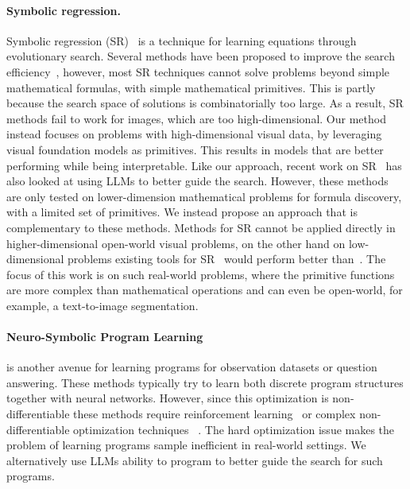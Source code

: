 \paragraph{Symbolic regression.}
Symbolic regression (SR)~\citep{cranmer2023interpretable} is a technique for learning equations through evolutionary search.
Several methods have been proposed to improve the search efficiency~\citep{makke2024interpretable}, however, most SR techniques cannot solve problems beyond simple mathematical formulas, with simple mathematical primitives.
This is partly because the search space of solutions is combinatorially too large. 
As a result, SR methods fail to work for images, which are too high-dimensional.
Our method instead focuses on problems with high-dimensional visual data, by leveraging visual foundation models as primitives.
This results in models that are better performing while being interpretable.
Like our approach, recent work on SR~\citep{grayeli2024symbolic, shojaee2024llm,merler2024context,li2024automated} has also looked at using LLMs to better guide the search.
However, these methods are only tested on lower-dimension mathematical problems for formula discovery, with a limited set of primitives. 
We instead propose an approach that is complementary to these methods.
Methods for SR cannot be applied directly in higher-dimensional open-world visual problems, on the other hand on low-dimensional problems existing tools for SR~\citep{grayeli2024symbolic} would perform better than~\disciple.
The focus of this work is on such real-world problems, where the primitive functions are more complex than mathematical operations and can even be open-world, for example, a text-to-image segmentation. 

\paragraph{Neuro-Symbolic Program Learning~\citep{mao2019neuro,dongneural}}is another avenue for learning programs for observation datasets or question answering. 
These methods typically try to learn both discrete program structures together with neural networks. 
However, since this optimization is non-differentiable these methods require reinforcement learning~\citep{johnson2017inferring} or complex non-differentiable optimization techniques ~\citep{ellis2021dreamcoder}.
The hard optimization issue makes the problem of learning programs sample inefficient in real-world settings.
We alternatively use LLMs ability to program to better guide the search for such programs.

